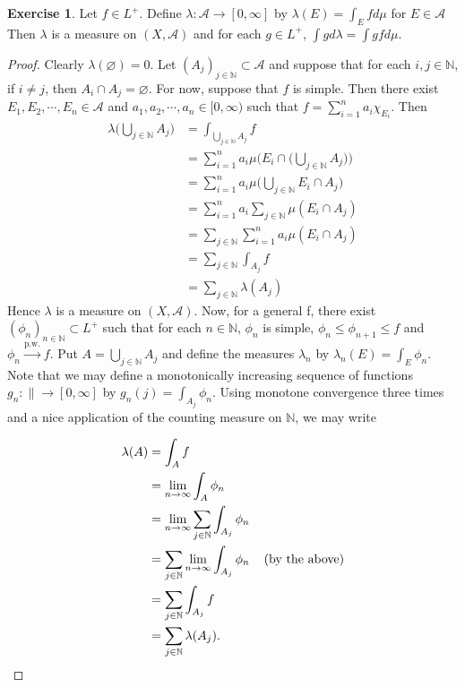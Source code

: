 \documentclass[12pt]{amsart}
\theoremstyle{definition}
\newtheorem{ex}[definition]{Exercise}
\newcommand{\lam}{\lambda}
\newcommand{\N}{\mathbb{N}}
\newcommand{\MA}{\mathcal{A}}
\newcommand{\RG}{[0,\infty]}
\newcommand{\Rg}{[0,\infty)}
\newcommand{\limn}{\lim \limits_{n \rightarrow \infty}}
\newcommand{\lex}[1]{\label{ex:#1}}
\begin{document}
	\begin{ex} \lex{00000} 
		Let $f \in L^+$. Define $\lam: \MA \rightarrow \RG$ by $\lam(E) = \int_E f d\mu$ for $E \in \MA$
		Then $\lam$ is a measure on $(X, \MA)$ and for each $g \in L^+$, $\int g d\lam = \int g f d\mu$.
	\end{ex}
	
	\begin{proof}
		Clearly $\lam(\varnothing) = 0$. Let $(A_j)_{j \in \N} \subset \MA$ and suppose that for each $i, j \in \N$, if $i \neq j$, then $A_i \cap A_j = \varnothing$. For now, suppose that $f$ is simple. Then there exist $E_1, E_2, \cdots, E_n \in \MA$ and  $a_1, a_2, \cdots, a_n \in \Rg$ such that $f = \sum\limits_{i=1}^n a_i \chi_{E_i}$.  Then 
		\begin{align*}
			\lam\bigg(\bigcup_{j \in \N} A_j\bigg) 
			&= \int_{\bigcup_{j \in \N} A_j} f\\
			&= \sum_{i = 1} ^n a_i\mu\bigg(E_i \cap \bigg(\bigcup_{j \in \N} A_j\bigg)\bigg)\\
			&= \sum_{i = 1} ^n a_i\mu\bigg(\bigcup_{j \in \N} E_i \cap A_j\bigg)\\
			&= \sum_{i = 1} ^n a_i \sum_{j \in \N} \mu(E_i \cap A_j)\\
			&= \sum_{j \in \N} \sum_{i = 1} ^n a_i \mu(E_i \cap A_j)\\
			&= \sum_{j \in \N} \int_{A_j} f\\
			&= \sum_{j \in \N} \lam(A_j)
		\end{align*} 
		Hence $\lam$ is a measure on $(X, \MA)$. Now, for a general f, there exist $(\phi_n)_{n \in \N} \subset L^+$ such that for each $n \in \N$, $\phi_n$ is simple, $\phi_n \leq \phi_{n+1} \leq f$ and $\phi_n \xrightarrow{\text{p.w.}} f$. Put $A = \bigcup_{j \in \N}A_j$ and define the measures $\lam_n$ by $\lam_n(E) = \int_E \phi_n$. Note that we may define a monotonically increasing sequence of functions $g_n: \|\rightarrow \RG$ by $g_n(j) = \int_{A_j} \phi_n$. Using monotone convergence three times and a nice application of the counting measure on $\N$, we may write
		
		\begin{align*}
			\lam(A) 
			&= \int_A f\\
			&= \limn \int_A \phi_n\\
			&= \limn \sum_{j \in \N} \int_{A_j} \phi_n\\
			&= \sum_{j \in \N} \limn \int_{A_j} \phi_n \hspace{4mm} \text{(by the above)}\\
			&= \sum_{j \in \N} \int_{A_j} f\\
			&= \sum_{j \in \N} \lam(A_j).
		\end{align*} 
		

\end{proof}
\end{document}
